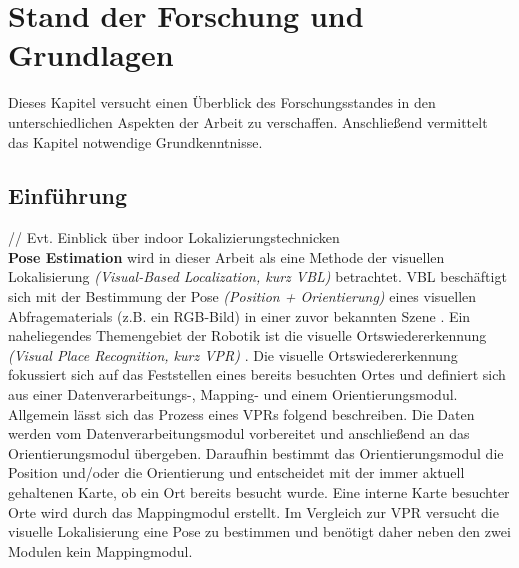 \pagebreak
\section{Stand der Forschung und Grundlagen}

Dieses Kapitel versucht einen Überblick des Forschungsstandes in den unterschiedlichen Aspekten der Arbeit zu verschaffen. Anschließend vermittelt das Kapitel notwendige Grundkenntnisse.

\subsection{Einführung}



// Evt. Einblick über indoor Lokalizierungstechnicken \\

\textbf{Pose Estimation} wird in dieser Arbeit als eine Methode der visuellen Lokalisierung \textit{(Visual-Based Localization, kurz VBL)} betrachtet. VBL beschäftigt sich mit der Bestimmung der Pose \textit{(Position + Orientierung)} eines visuellen Abfragematerials (z.B. ein RGB-Bild) in einer zuvor bekannten Szene  \cite{piascoSurveyVisualBasedLocalization2018}.
Ein naheliegendes Themengebiet der Robotik ist die visuelle Ortswiedererkennung \textit{(Visual Place Recognition, kurz VPR)} \cite{lowryVisualPlaceRecognition2016}. Die visuelle Ortswiedererkennung fokussiert sich auf das Feststellen eines bereits besuchten Ortes und definiert sich aus einer Datenverarbeitungs-, Mapping- und einem Orientierungsmodul. Allgemein lässt sich das Prozess eines VPRs \cite{lowryVisualPlaceRecognition2016} folgend beschreiben. Die Daten werden vom Datenverarbeitungsmodul vorbereitet und anschließend an das Orientierungsmodul übergeben. Daraufhin bestimmt das Orientierungsmodul die Position und/oder die Orientierung und entscheidet mit der immer aktuell gehaltenen Karte, ob ein Ort bereits besucht wurde. Eine interne Karte besuchter Orte wird durch das Mappingmodul erstellt. Im Vergleich zur VPR \cite{lowryVisualPlaceRecognition2016} versucht die visuelle Lokalisierung \cite{piascoSurveyVisualBasedLocalization2018} eine Pose zu bestimmen und benötigt daher neben den zwei Modulen kein Mappingmodul.

